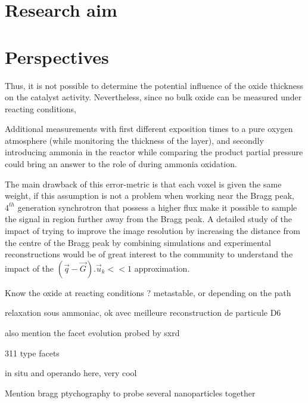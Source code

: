 \section{Research aim}


\section{Perspectives}

Thus, it is not possible to determine the potential influence of the oxide thickness on the catalyst activity.
Nevertheless, since no bulk oxide can be measured under reacting conditions,

Additional measurements with first different exposition times to a pure oxygen atmosphere (while monitoring the thickness of the  layer), and secondly introducing ammonia in the reactor while comparing the product partial pressure could bring an answer to the role of  during ammonia oxidation.

The main drawback of this error-metric is that each voxel is given the same weight, if this assumption is not a problem when working near the Bragg peak, $4^{th}$ generation synchrotron that possess a higher flux make it possible to sample the signal in region further away from the Bragg peak.
A detailed study of the impact of trying to improve the image resolution by increasing the distance from the centre of the Bragg peak by combining simulations and experimental reconstructions would be of great interest to the community to understand the impact of the $(\vec{q}-\vec{G}).\vec{u}_k<<1$ approximation.

Know the oxide at reacting conditions ? metastable, or depending on the path

relaxation sous ammoniac, ok avec meilleure reconstruction de particule D6

also mention the facet evolution probed by sxrd

311 type facets

in situ and operando here, very cool

Mention bragg ptychography to probe several nanoparticles together
